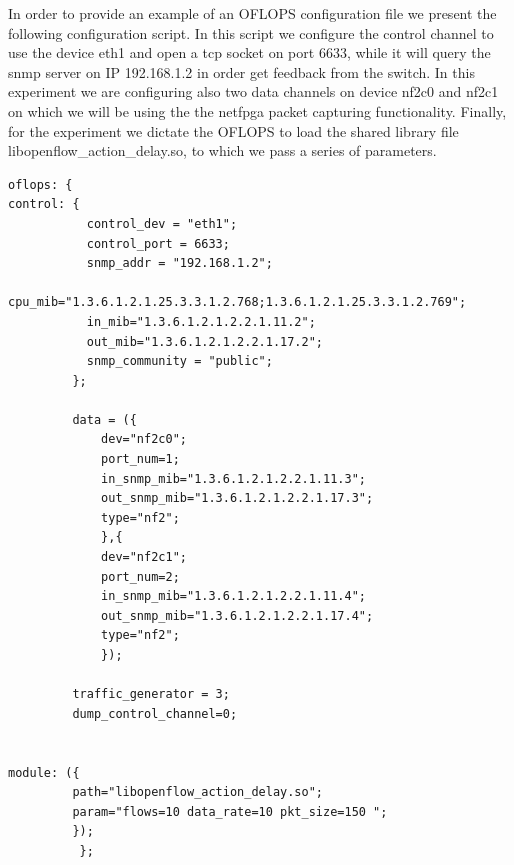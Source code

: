 \documentclass{book}
\begin{document}
          In order to provide an example of an OFLOPS configuration file we present the
          following configuration script. In this script we configure the control channel
          to use the device eth1 and open a tcp socket on port 6633, while it will query
          the snmp server on IP 192.168.1.2 in order get feedback from the switch. In this
          experiment we are configuring also two data channels on device nf2c0 and nf2c1
          on which we will be using the the netfpga packet capturing functionality.
          Finally, for the experiment we dictate the OFLOPS to load the shared library
          file libopenflow\_action\_delay.so, to which we pass a series of parameters. 

          \lstset{language=Java,numbers=left,frame=single,title=oflops.cfg}
          \begin{lstlisting}[frame=single]                % Start your code-block
          oflops: {
control: {
           control_dev = "eth1";
           control_port = 6633;
           snmp_addr = "192.168.1.2";
           cpu_mib="1.3.6.1.2.1.25.3.3.1.2.768;1.3.6.1.2.1.25.3.3.1.2.769";  
           in_mib="1.3.6.1.2.1.2.2.1.11.2";
           out_mib="1.3.6.1.2.1.2.2.1.17.2";
           snmp_community = "public";
         };

         data = ({
             dev="nf2c0";
             port_num=1;
             in_snmp_mib="1.3.6.1.2.1.2.2.1.11.3";
             out_snmp_mib="1.3.6.1.2.1.2.2.1.17.3";
             type="nf2";
             },{
             dev="nf2c1";
             port_num=2;
             in_snmp_mib="1.3.6.1.2.1.2.2.1.11.4";
             out_snmp_mib="1.3.6.1.2.1.2.2.1.17.4";
             type="nf2";
             });

         traffic_generator = 3;
         dump_control_channel=0;


module: ({
         path="libopenflow_action_delay.so";
         param="flows=10 data_rate=10 pkt_size=150 ";
         });
          };


\end{lstlisting}

% 
% 
% 
\end{document}
